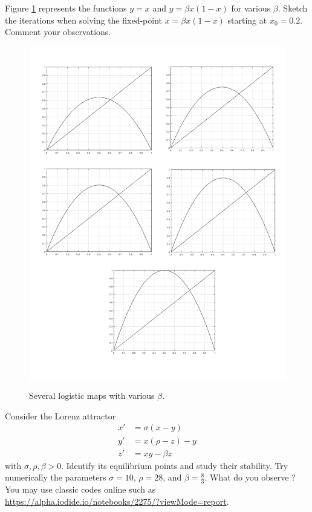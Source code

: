 \begin{Exercise} \label{ex:lm}
Figure \ref{fig:log} represents the functions $y = x$ and $y = \beta x(1-x)$ for various $\beta$. Sketch the iterations when solving the fixed-point $x = \beta x(1-x) $ starting at $x_0 = 0.2$. Comment your observations.
 \begin{figure}[h]
  \centering
  \includegraphics[width=0.9\linewidth]{img/logisticmap_empty.pdf}\\
  \caption{Several logistic maps with various $\beta$.}
  \label{fig:log}
 \end{figure}
 \end{Exercise}
 
 \begin{Exercise} 
Consider the Lorenz attractor
  \[\begin{aligned}
  x' & = \sigma (x-y)\\
  y' & = x(\rho -z) - y \\
  z' & = xy - \beta z
  \end{aligned}
  \]
  with $\sigma, \rho, \beta >0$.  Identify its equilibrium points and study their stability. Try numerically the parameters $\sigma  = 10$, $\rho = 28$, and $\beta = \frac{8}{3}$. What do you observe ? You may use classic codes online such as \url{https://alpha.iodide.io/notebooks/2275/?viewMode=report}.\\
  \dotfill

\dotfill

\dotfill

\dotfill

\dotfill

\dotfill

\dotfill

\dotfill

\dotfill

\dotfill
 \end{Exercise}
 
